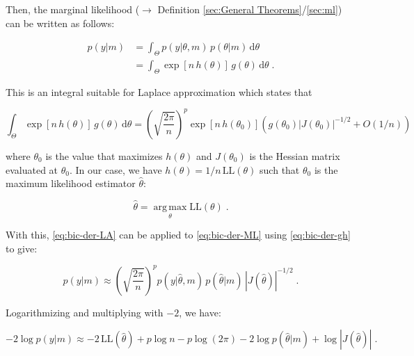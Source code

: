 \documentclass[a4paper,12pt,twoside]{book}
\begin{document}
Then, the marginal likelihood ($\rightarrow$ Definition \ref{sec:General Theorems}/\ref{sec:ml}) can be written as follows:

\begin{equation} \label{eq:bic-der-ML}
\begin{split}
p(y|m) &= \int_{\Theta} p(y|\theta,m) \, p(\theta|m) \, \mathrm{d}\theta \\
&= \int_{\Theta} \exp\left[n \, h(\theta)\right] \, g(\theta) \, \mathrm{d}\theta \; .
\end{split}
\end{equation}

This is an integral suitable for Laplace approximation which states that

\begin{equation} \label{eq:bic-der-LA}
\int_{\Theta} \exp\left[n \, h(\theta)\right] \, g(\theta) \, \mathrm{d}\theta = \left( \sqrt{\frac{2 \pi}{n}} \right)^p \exp\left[n \, h(\theta_0)\right] \left( g(\theta_0) \left| J(\theta_0) \right|^{-1/2} + O(1/n) \right)
\end{equation}

where $\theta_0$ is the value that maximizes $h(\theta)$ and $J(\theta_0)$ is the Hessian matrix evaluated at $\theta_0$. In our case, we have $h(\theta) = 1/n \, \mathrm{LL}(\theta)$ such that $\theta_0$ is the maximum likelihood estimator $\hat{\theta}$:

\begin{equation} \label{eq:bic-der-MLE}
\hat{\theta} = \operatorname*{arg\,max}_\theta \mathrm{LL}(\theta) \; .
\end{equation}

With this, \eqref{eq:bic-der-LA} can be applied to \eqref{eq:bic-der-ML} using \eqref{eq:bic-der-gh} to give:

\begin{equation} \label{eq:bic-der-ML-approx}
p(y|m) \approx \left( \sqrt{\frac{2 \pi}{n}} \right)^p p(y|\hat{\theta},m) \, p(\hat{\theta}|m) \, \left| J(\hat{\theta}) \right|^{-1/2} \; .
\end{equation}

Logarithmizing and multiplying with $-2$, we have:

\begin{equation} \label{eq:bic-der-LME-approx}
-2 \log p(y|m) \approx -2 \, \mathrm{LL}(\hat{\theta}) + p \log n - p \log(2 \pi) - 2 \log p(\hat{\theta}|m) + \log \left| J(\hat{\theta}) \right| \; .
\end{equation}
\end{document}
